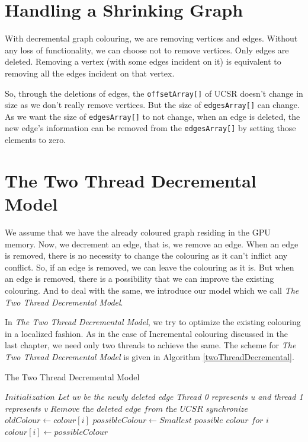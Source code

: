 \documentclass[MTech]{iitmdiss}
\begin{document}
\section{Handling a Shrinking Graph}
With decremental graph colouring, we are removing vertices and edges. Without any loss of functionality, we can choose not to remove vertices. Only edges are deleted. Removing a vertex (with some edges incident on it) is equivalent to removing all the edges incident on that vertex. 

So, through the deletions of edges, the \verb+offsetArray[]+ of UCSR doesn't change in size as we don't really remove vertices. But the size of \verb+edgesArray[]+ can change. As we want the size of \verb+edgesArray[]+ to not change, when an edge is deleted, the new edge's information can be removed from the \verb+edgesArray[]+ by setting those elements to zero.

\section{The Two Thread Decremental Model}
We assume that we have the already coloured graph residing in the GPU memory. Now, we decrement an edge, that is, we remove an edge. When an edge is removed, there is no necessity to change the colouring as it can't inflict any conflict. So, if an edge is removed, we can leave the colouring as it is. But when an edge is removed, there is a possibility that we can improve the existing colouring. And to deal with the same, we introduce our model which we call \textit{The Two Thread Decremental Model}.

In \textit{The Two Thread Decremental Model}, we try to optimize the existing colouring in a localized fashion. As in the case of Incremental colouring discussed in the last chapter, we need only two threads to achieve the same. The scheme for \textit{The Two Thread Decremental Model} is given in Algorithm \ref{twoThreadDecremental}.

\begin{algorithm}
\caption{The Two Thread Decremental Model}\label{twoThreadDecremental}
\begin{algorithmic}[1]
\State $\textit{Initialization}$
\State \textit{Let uv be the newly deleted edge}
\State \textit{Thread 0 represents u and thread 1 represents v} \label{13.4}
\State $\textit{Remove the deleted edge from the UCSR}$ \label{13.5}
\State \textit{synchronize}\label{13.6}
  \label{13.7}
\State $oldColour \gets colour[i]$ \label{13.8}
\State $possibleColour \gets \textit{Smallest possible colour for i}$ \label{13.9}
\label{13.10}
\State $colour[i] \gets possibleColour$\label{13.11}
\EndIf
\EndFor
\EndProcedure
\end{algorithmic}
\end{algorithm}
\end{document}
